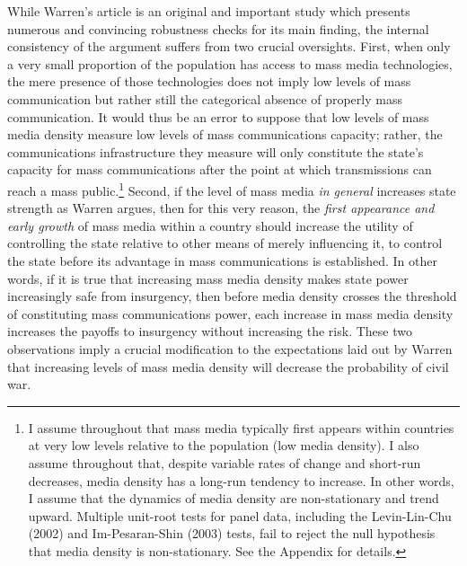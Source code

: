 \documentclass[11pt,article,oneside]{memoir}
\begin{document}
While Warren's article is an original and important study which presents
numerous and convincing robustness checks for its main finding, the
internal consistency of the argument suffers from two crucial
oversights. First, when only a very small proportion of the population
has access to mass media technologies, the mere presence of those
technologies does not imply low levels of mass communication but rather
still the categorical absence of properly mass communication. It would
thus be an error to suppose that low levels of mass media density
measure low levels of mass communications capacity; rather, the
communications infrastructure they measure will only constitute the
state's capacity for mass communications after the point at which
transmissions can reach a mass public.\footnote{I assume throughout that
  mass media typically first appears within countries at very low levels
  relative to the population (low media density). I also assume
  throughout that, despite variable rates of change and short-run
  decreases, media density has a long-run tendency to increase. In other
  words, I assume that the dynamics of media density are non-stationary
  and trend upward. Multiple unit-root tests for panel data, including
  the Levin-Lin-Chu (2002) and Im-Pesaran-Shin (2003) tests, fail to
  reject the null hypothesis that media density is non-stationary. See
  the Appendix for details.} Second, if the level of mass media \emph{in
general} increases state strength as Warren argues, then for this very
reason, the \emph{first appearance and early growth} of mass media
within a country should increase the utility of controlling the state
relative to other means of merely influencing it, to control the state
before its advantage in mass communications is established. In other
words, if it is true that increasing mass media density makes state
power increasingly safe from insurgency, then before media density
crosses the threshold of constituting mass communications power, each
increase in mass media density increases the payoffs to insurgency
without increasing the risk. These two observations imply a crucial
modification to the expectations laid out by Warren that increasing
levels of mass media density will decrease the probability of civil war.
\end{document}
